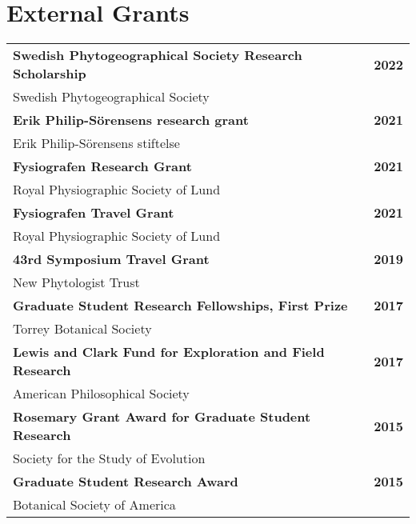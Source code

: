 \documentclass[letterpaper,11pt]{article}
\begin{document}
\section{External Grants}
\begin{tabular*}{1.0\textwidth}[t]{l@{\extracolsep{\fill}}r}

\textbf{Swedish Phytogeographical Society Research Scholarship} & {\textbf{2022}}\\
Swedish Phytogeographical Society\vspace{7pt}\\

\textbf{Erik Philip-Sörensens research grant} & {\textbf{2021}}\\
Erik Philip-Sörensens stiftelse\vspace{7pt}\\

\textbf{Fysiografen Research Grant} & {\textbf{2021}}\\
Royal Physiographic Society of Lund\vspace{7pt}\\

\textbf{Fysiografen Travel Grant} & {\textbf{2021}}\\
Royal Physiographic Society of Lund\vspace{7pt}\\

\textbf{43rd Symposium Travel Grant} & {\textbf{2019}}\\
New Phytologist Trust\vspace{7pt}\\

\textbf{Graduate Student Research Fellowships, First Prize} & {\textbf{2017}}\\
Torrey Botanical Society\vspace{7pt}\\

\textbf{Lewis and Clark Fund for Exploration and Field Research} & {\textbf{2017}}\\
American Philosophical Society\vspace{7pt}\\

\textbf{Rosemary Grant Award for Graduate Student Research} & {\textbf{2015}}\\
Society for the Study of Evolution\vspace{7pt}\\

\textbf{Graduate Student Research Award} & {\textbf{2015}}\\
Botanical Society of America\\
\end{tabular*}
\end{document}

